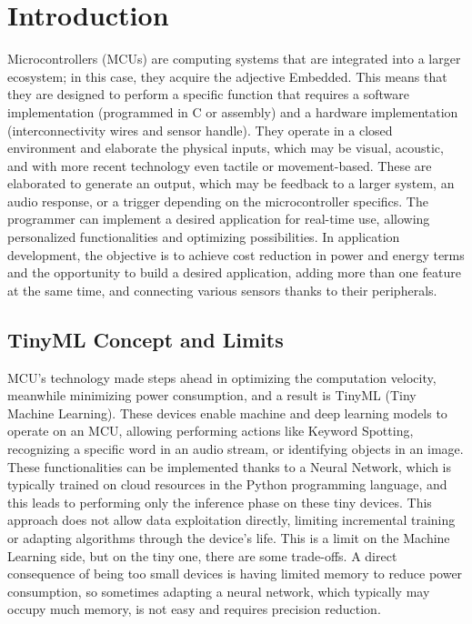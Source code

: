 \chapter{Introduction}
\label{cha:intro}
Microcontrollers (MCUs) are computing systems that are integrated into a larger ecosystem; in this case, they acquire the adjective Embedded. This means that they are designed to perform a specific function that requires a software implementation (programmed in C or assembly) and a hardware implementation (interconnectivity wires and sensor handle). They operate in a closed environment and elaborate the physical inputs, which may be visual, acoustic, and with more recent technology even tactile or movement-based. These are elaborated to generate an output, which may be feedback to a larger system, an audio response, or a trigger depending on the microcontroller specifics. 
The programmer can implement a desired application for real-time use, allowing personalized functionalities and optimizing possibilities. In application development, the objective is to achieve cost reduction in power and energy terms and the opportunity to build a desired application, adding more than one feature at the same time, and connecting various sensors thanks to their peripherals. 
\section{TinyML Concept and Limits}
\label{sec:context}                                                                      
MCU's technology made steps ahead in optimizing the computation velocity, meanwhile minimizing power consumption, and a result is TinyML (Tiny Machine Learning). These devices enable machine and deep learning models to operate on an MCU, allowing performing actions like Keyword Spotting, recognizing a specific word in an audio stream, or identifying objects in an image.
These functionalities can be implemented thanks to a Neural Network, which is typically trained on cloud resources in the Python programming language, and this leads to performing only the inference phase on these tiny devices. This approach does not allow data exploitation directly, limiting incremental training or adapting algorithms through the device's life. This is a limit on the Machine Learning side, but on the tiny one, there are some trade-offs. A direct consequence of being too small devices is having limited memory to reduce power consumption, so sometimes adapting a neural network, which typically may occupy much memory, is not easy and requires precision reduction. 
